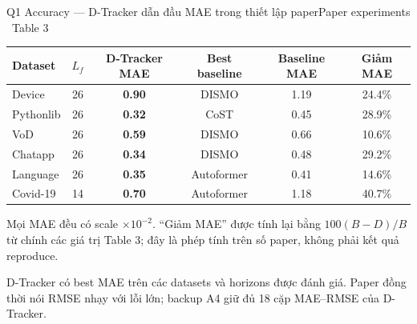 \begin{frame}[shrink=30]{Q1 Accuracy --- D-Tracker dẫn đầu MAE trong thiết lập paper}{Paper experiments \textperiodcentered\ Table 3}
\centering
{\small
\begin{tabular}{@{}lccccc@{}}
  \toprule
  Dataset & $L_f$ & D-Tracker MAE & Best baseline & Baseline MAE & Giảm MAE\\
  \midrule
  Device & 26 & \textbf{0.90} & DISMO & 1.19 & 24.4\%\\
  Pythonlib & 26 & \textbf{0.32} & CoST & 0.45 & 28.9\%\\
  VoD & 26 & \textbf{0.59} & DISMO & 0.66 & 10.6\%\\
  Chatapp & 26 & \textbf{0.34} & DISMO & 0.48 & 29.2\%\\
  Language & 26 & \textbf{0.35} & Autoformer & 0.41 & 14.6\%\\
  Covid-19 & 14 & \textbf{0.70} & Autoformer & 1.18 & 40.7\%\\
  \bottomrule
\end{tabular}}
\vspace{3mm}
\begin{intuition}
  Mọi MAE đều có scale \textbf{$\times10^{-2}$}. “Giảm MAE” được tính lại bằng $100(B-D)/B$ từ chính các giá trị Table 3; đây là phép tính trên số paper, không phải kết quả reproduce.
\end{intuition}
\vspace{3mm}
\begin{takeaway}
  D-Tracker có best MAE trên các datasets và horizons được đánh giá. Paper đồng thời nói RMSE nhạy với lỗi lớn; backup A4 giữ đủ 18 cặp MAE--RMSE của D-Tracker.
\end{takeaway}
\vspace{2mm}
\end{frame}

